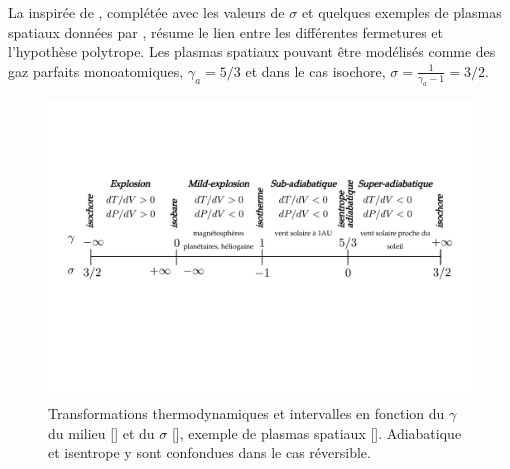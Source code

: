 La  inspirée de \cite{livadiotis_non-equilibrium_2012}, complétée avec les valeurs de $\sigma$ et quelques exemples de plasmas spatiaux données par \cite{livadiotis_long-term_2018}, résume le lien entre les différentes fermetures et l'hypothèse polytrope. Les plasmas spatiaux pouvant être modélisés comme des gaz parfaits monoatomiques, $\gamma_a = 5/3$ et dans le cas isochore, $\sigma = \frac{1}{\gamma_a-1}=3/2$.
\begin{figure}[!ht]
 \centering
\includegraphics[width=0.9\linewidth,trim=1cm 8cm 1cm 5.5cm, clip=true]{./Part_1/images/schema_thermo.pdf}
\caption{Transformations thermodynamiques et intervalles en fonction du $\gamma$ du milieu [\cite{livadiotis_non-equilibrium_2012}] et du $\sigma$ [\cite{borel_thermodynamique_2005}], exemple de plasmas spatiaux [\cite{livadiotis_long-term_2018}]. Adiabatique et isentrope y sont confondues dans le cas réversible.}
\label{fig:schema_thermo}
\end{figure}

